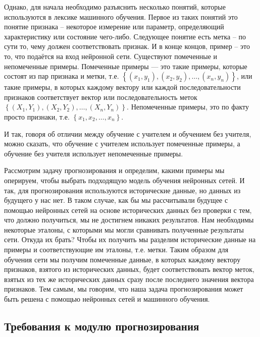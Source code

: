 {  \par \redline Однако, для начала необходимо разъяснить несколько понятий, которые используются в лексике машинного обучения. Первое из таких понятий это понятие признака – некоторое измерение или параметр, определяющий характеристику или состояние чего-либо. Следующее понятие есть метка – по сути то, чему должен соответствовать признак.  И в конце концов, пример – это то, что подаётся на вход нейронной сети. Существуют помеченные и непомеченные примеры. Помеченные примеры — это такие примеры, которые состоят из пар признака и метки, т.е. $\left\{\left(x_{1}, y_{1}\right), \left(x_{2}, y_{2}\right), \dots, \left(x_{n}, y_{n}\right)\right\}$, или такие примеры, в которых каждому вектору или каждой последовательности признаков соответствует вектор или последовательность меток $\left\{\left(X_{1}, Y_{1}\right), \left(X_{2}, Y_{2}\right), \dots, \left(X_{n}, Y_{n}\right)\right\}$. Непомеченные примеры, это по факту просто признаки, т.е. $\left\{x_{1}, x_{2}, \dots, x_{n}\right\}$. 

  \par \redline И так, говоря об отличии между обучение с учителем и обучением без учителя, можно сказать, что обучение с учителем использует помеченные примеры, а обучение без учителя использует непомеченные примеры. 

  \par \redline	Рассмотрим задачу прогнозирования и определим, какими примеры мы оперируем, чтобы выбрать подходящую модель обучения нейронных сетей. И так, для прогнозирования используются исторические данные, но данных из будущего у нас нет. В таком случае, как бы мы рассчитывали будущее с помощью нейронных сетей на основе исторических данных без проверки с тем, что должно получиться, мы не достигнем никаких результатов. Нам необходимы некоторые эталоны, с которыми мы могли сравнивать полученные результаты сети. Откуда их брать? Чтобы их получить мы разделим исторические данные на примеры и соответствующие им эталоны, т.е. метки. Таким образом для обучения сети мы получим помеченные данные, в которых каждому вектору признаков, взятого из исторических данных, будет соответствовать вектор меток, взятых из тех же исторических данных сразу после последнего значения вектора признаков. Тем самым, мы говорим, что наша задача прогнозирования может быть решена с помощью нейронных сетей и машинного обучения.

  \par
}

\titlespace
\subsection*{  \cyrillicfont 
  \fontsize{14pt}{24pt}\selectfont
  \englishfont
  \redline
  Требования к модулю прогнозирования
} 
\titlespace

